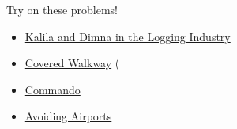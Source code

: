\documentclass{beamer}
\begin{document}
\begin{frame}{Try on these problems!}
    \begin{itemize}
        \item \href{https://codeforces.com/contest/319/problem/C}{Kalila and Dimna in the Logging Industry}
        \item \href{https://open.kattis.com/problems/coveredwalkway}{Covered Walkway} (
        \item \href{https://dmoj.ca/problem/apio10p1}{Commando}
        \item \href{https://open.kattis.com/problems/avoidingairports}{Avoiding Airports}
    \end{itemize}
\end{frame}
\end{document}
